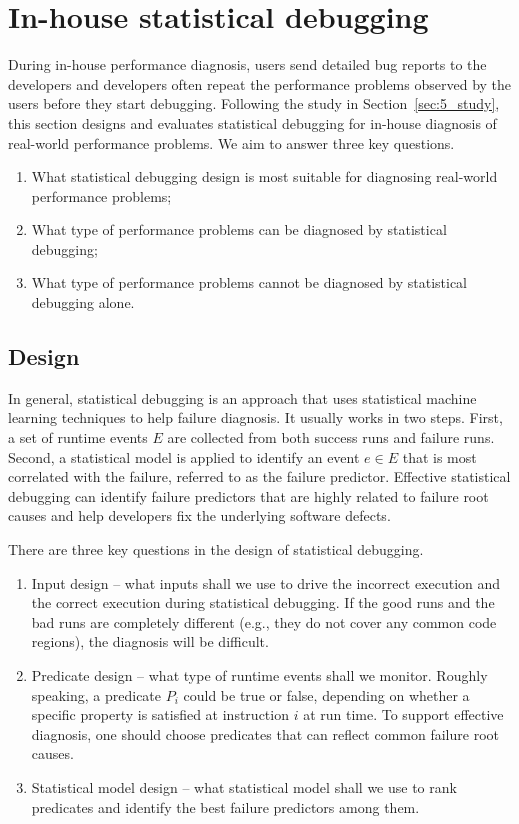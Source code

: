 \section{In-house statistical debugging}
\label{sec:5_inhouse}
During in-house performance diagnosis, users send detailed bug reports to
the developers and developers often repeat the performance problems
observed by the users before they start debugging.
Following the study in Section~\ref{sec:5_study}, this section designs and
evaluates statistical debugging for in-house diagnosis of real-world
performance problems.
We aim to answer three key questions.

\begin{enumerate}
\item What statistical debugging design is most suitable for diagnosing
real-world performance problems;
\item What type of performance problems can be diagnosed by statistical
debugging;
\item What type of performance problems cannot be diagnosed by statistical
debugging alone.
\end{enumerate}

\subsection{Design}
In general, statistical debugging 
\citep{liblit03,liblit05,CCI,tarantula1,tarantula2,tarantula.darko,joy.asplos13}
is an approach that uses statistical machine learning techniques to help
failure diagnosis. It usually works in two steps.
First, a set of runtime 
events $E$ are collected from both success runs and failure runs.
Second, a statistical model is applied to identify an event $e \in E $
that is most correlated with the failure, referred to as the failure predictor. 
Effective statistical debugging can identify failure predictors that are
highly related to failure root causes and help developers fix the underlying
software defects.

There are three key questions in the design of statistical debugging.
\begin{enumerate}
\item Input design --
what inputs shall we use to drive the 
incorrect execution and the correct execution during statistical debugging.
If the good runs and the bad runs are completely different
(e.g., they do not cover any common code regions), the diagnosis will
be difficult.
\item Predicate design -- what type of runtime events shall we monitor.
Roughly speaking, a predicate $P_i$ could be true or false, depending on 
whether a specific property is satisfied at instruction $i$ at run time.
To support effective diagnosis, one should choose predicates that can reflect 
common failure root causes.
\item Statistical model design -- what statistical model shall we use to
rank predicates and identify the best failure predictors among them.
\end{enumerate}

